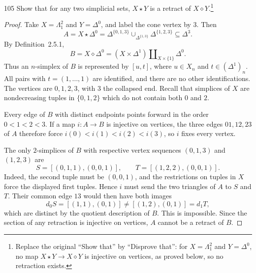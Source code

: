 \begin{exercise}{105}
Show that for any two simplicial sets, $X\star Y$ is a retract of
$X\diamond Y$.\footnote{Replace the original ``Show that'' by ``Disprove that'':
for $X=\Lambda^2_1$ and $Y=\Delta^0$, no map $X\star Y\to X\diamond Y$
is injective on vertices, as proved below, so no retraction exists.}

\begin{proof}
Take $X=\Lambda^2_1$ and $Y=\Delta^0$, and label the cone vertex by $3$.
Then
\[
 A=X\star\Delta^0
 =\Delta^{\{0,1,3\}}\cup_{\Delta^{\{1,3\}}}\Delta^{\{1,2,3\}}
 \subseteq\Delta^3.
\]
By Definition~2.5.1,
\[
 B=X\diamond\Delta^0
 =(X\times\Delta^1)\amalg_{X\times\{1\}}\Delta^0.
\]
Thus an $n$-simplex of $B$ is represented by $[u,t]$, where
$u\in X_n$ and $t\in(\Delta^1)_n$.
All pairs with $t=(1,\ldots,1)$ are identified, and there are no other
identifications. The vertices are $0,1,2,3$, with $3$ the collapsed end.
Recall that simplices of $X$ are nondecreasing tuples in $\{0,1,2\}$
which do not contain both $0$ and $2$.

Every edge of $B$ with distinct endpoints points forward in the order
$0<1<2<3$.
If a map $i\colon A\to B$ is injective on vertices, the three edges
$01,12,23$ of $A$ therefore force
$i(0)<i(1)<i(2)<i(3)$, so $i$ fixes every vertex.

The only $2$-simplices of $B$ with respective vertex sequences
$(0,1,3)$ and $(1,2,3)$ are
\[
 S=[(0,1,1),(0,0,1)],\qquad
 T=[(1,2,2),(0,0,1)].
\]
Indeed, the second tuple must be $(0,0,1)$, and the restrictions on
tuples in $X$ force the displayed first tuples.
Hence $i$ must send the two triangles of $A$ to $S$ and $T$.
Their common edge $13$ would then have both images
\[
 d_0S=[(1,1),(0,1)]\ne[(1,2),(0,1)]=d_1T,
\]
which are distinct by the quotient description of $B$.
This is impossible. Since the section of any retraction is injective
on vertices, $A$ cannot be a retract of $B$.
\end{proof}
\end{exercise}
